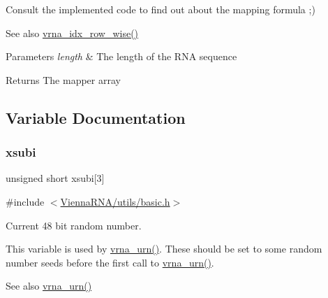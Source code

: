 Consult the implemented code to find out about the mapping formula ;)

\begin{DoxySeeAlso}{See also}
\hyperlink{group__utils_ga70b180e9ea764218a82647a1cd347445}{vrna\+\_\+idx\+\_\+row\+\_\+wise()} 
\end{DoxySeeAlso}

\begin{DoxyParams}{Parameters}
{\em length} & The length of the R\+NA sequence \\
\hline
\end{DoxyParams}
\begin{DoxyReturn}{Returns}
The mapper array 
\end{DoxyReturn}


\subsection{Variable Documentation}
\mbox{\label{group__utils_gaf9a866c8417afda7368bbac939ab3c47}} 
\subsubsection{\texorpdfstring{xsubi}{xsubi}}
{\footnotesize\ttfamily unsigned short xsubi\mbox{[}3\mbox{]}}



{\ttfamily \#include $<$\hyperlink{utils_2basic_8h}{Vienna\+R\+N\+A/utils/basic.\+h}$>$}



Current 48 bit random number. 

This variable is used by \hyperlink{group__utils_ga384e256ebb295d04a14426179db0dd6e}{vrna\+\_\+urn()}. These should be set to some random number seeds before the first call to \hyperlink{group__utils_ga384e256ebb295d04a14426179db0dd6e}{vrna\+\_\+urn()}.

\begin{DoxySeeAlso}{See also}
\hyperlink{group__utils_ga384e256ebb295d04a14426179db0dd6e}{vrna\+\_\+urn()} 
\end{DoxySeeAlso}
